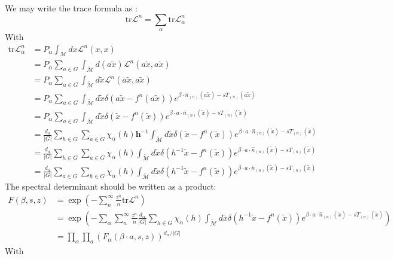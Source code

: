 \begin{description}
We may write the trace formula as :
\[
\mathrm{tr}\mathcal{L}^{n}=\sum_{\alpha}\mathrm{tr}\mathcal{L}_{\alpha}^{n}
\]
With
\begin{align*}
\mathrm{tr}\mathcal{L}_{\alpha}^{n} & =P_{\alpha}\int_{\mathcal{M}}dx\mathcal{L}^{n}(x,x)\\
 & =P_{\alpha}\sum_{a\in G}\int_{\mathcal{\tilde{\mathcal{M}}}}d(a\tilde{x})\mathcal{L}^{n}(a\tilde{x},a\tilde{x})\\
 & =P_{\alpha}\sum_{a\in G}\int_{\mathcal{\tilde{\mathcal{M}}}}d\tilde{x}\mathcal{L}^{n}(a\tilde{x},a\tilde{x})\\
 & =P_{\alpha}\sum_{a\in G}\int_{\mathcal{\tilde{\mathcal{M}}}}d\tilde{x}\delta(a\tilde{x}-f^{n}(a\tilde{x}))e^{\beta\cdot\hat{n}_{(n)}(a\tilde{x})-sT_{(n)}(a\tilde{x})}\\
 & =P_{\alpha}\sum_{a\in G}\int_{\mathcal{\tilde{\mathcal{M}}}}d\tilde{x}\delta(\tilde{x}-f^{n}(\tilde{x}))e^{\beta\cdot a\cdot\hat{n}_{(n)}(\tilde{x})-sT_{(n)}(\tilde{x})}\\
 & =\frac{d_{\alpha}}{\vert G\vert}\sum_{h\in G}\sum_{a\in G}\chi_{\alpha}(h)\mathbf{h}^{-1}\int_{\mathcal{\tilde{\mathcal{M}}}}d\tilde{x}\delta(\tilde{x}-f^{n}(\tilde{x}))e^{\beta\cdot a\cdot\hat{n}_{(n)}(\tilde{x})-sT_{(n)}(\tilde{x})}\\
 & =\frac{d_{\alpha}}{\vert G\vert}\sum_{h\in G}\sum_{a\in G}\chi_{\alpha}(h)\int_{\mathcal{\tilde{\mathcal{M}}}}d\tilde{x}\delta(h^{-1}\tilde{x}-f^{n}(\tilde{x}))e^{\beta\cdot a\cdot\hat{n}_{(n)}(\tilde{x})-sT_{(n)}(\tilde{x})}\\
 & =\frac{d_{\alpha}}{\vert G\vert}\sum_{a\in G}\sum_{h\in G}\chi_{\alpha}(h)\int_{\mathcal{\tilde{\mathcal{M}}}}d\tilde{x}\delta(h^{-1}\tilde{x}-f^{n}(\tilde{x}))e^{\beta\cdot a\cdot\hat{n}_{(n)}(\tilde{x})-sT_{(n)}(\tilde{x})}
\end{align*}
The spectral determinant should be written as a product:
\begin{align*}
F(\beta,s,z) & =\exp\left(-\sum_{n}^{\infty}\frac{z^{n}}{n}\mathrm{tr}\mathcal{L}^{n}\right)\\
 & =\exp\left(-\sum_{\alpha}\sum_{n}^{\infty}\frac{z^{n}}{n}\frac{d_{\alpha}}{\vert G\vert}\sum_{h\in G}\chi_{\alpha}(h)\int_{\mathcal{\tilde{\mathcal{M}}}}d\tilde{x}\delta(h^{-1}\tilde{x}-f^{n}(\tilde{x}))e^{\beta\cdot a\cdot\hat{n}_{(n)}(\tilde{x})-sT_{(n)}(\tilde{x})}\right)\\
 & =\prod_{\alpha}\prod_{a}\left(F_{\alpha}(\beta\cdot a,s,z)\right)^{d_{\alpha}/\vert G\vert}
\end{align*}
With


\end{description}
